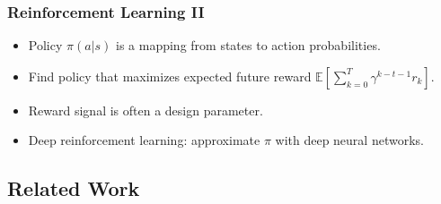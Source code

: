\begin{frame}
    \frametitle{Reinforcement Learning II}

    \begin{itemize}
        \item Policy \(\pi(a|s)\) is a mapping from states to action probabilities.
        \item Find policy that maximizes expected future reward \(\mathbb{E} \left\lbrack \sum_{k=0}^{T} \gamma^{k-t-1} r_k \right\rbrack\).
        \item Reward signal is often a design parameter.
        \item Deep reinforcement learning: approximate \(\pi\) with deep neural networks.
    \end{itemize}

\end{frame}

\subsection{Related Work}


